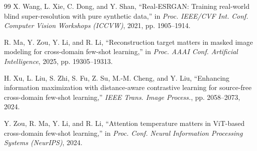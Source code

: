 \documentclass[conference]{IEEEtran}
\begin{document}
\begin{thebibliography}{99}
 X. Wang, L. Xie, C. Dong, and Y. Shan, ``Real-ESRGAN: Training real-world blind super-resolution with pure synthetic data,'' in \emph{Proc. IEEE/CVF Int. Conf. Computer Vision Workshops (ICCVW)}, 2021, pp. 1905--1914.

 R. Ma, Y. Zou, Y. Li, and R. Li, ``Reconstruction target matters in masked image modeling for cross-domain few-shot learning,'' in \emph{Proc. AAAI Conf. Artificial Intelligence}, 2025, pp. 19305--19313.

 H. Xu, L. Liu, S. Zhi, S. Fu, Z. Su, M.-M. Cheng, and Y. Liu, ``Enhancing information maximization with distance-aware contrastive learning for source-free cross-domain few-shot learning,'' \emph{IEEE Trans. Image Process.}, pp. 2058--2073, 2024.

 Y. Zou, R. Ma, Y. Li, and R. Li, ``Attention temperature matters in ViT-based cross-domain few-shot learning,'' in \emph{Proc. Conf. Neural Information Processing Systems (NeurIPS)}, 2024.

\end{thebibliography}
\end{document}
